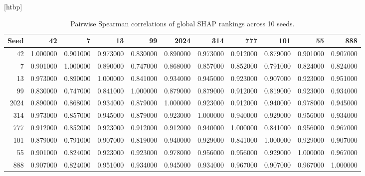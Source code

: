 \begin{table}
\small[htbp]
\caption{Pairwise Spearman correlations of global SHAP rankings across 10 seeds.}
\label{tab:A04_shap_stability_matrix}
\begin{tabular}{rrrrrrrrrrr}
\toprule
Seed & 42 & 7 & 13 & 99 & 2024 & 314 & 777 & 101 & 55 & 888 \\
\midrule
42 & 1.000000 & 0.901000 & 0.973000 & 0.830000 & 0.890000 & 0.973000 & 0.912000 & 0.879000 & 0.901000 & 0.907000 \\
7 & 0.901000 & 1.000000 & 0.890000 & 0.747000 & 0.868000 & 0.857000 & 0.852000 & 0.791000 & 0.824000 & 0.824000 \\
13 & 0.973000 & 0.890000 & 1.000000 & 0.841000 & 0.934000 & 0.945000 & 0.923000 & 0.907000 & 0.923000 & 0.951000 \\
99 & 0.830000 & 0.747000 & 0.841000 & 1.000000 & 0.879000 & 0.879000 & 0.912000 & 0.819000 & 0.923000 & 0.934000 \\
2024 & 0.890000 & 0.868000 & 0.934000 & 0.879000 & 1.000000 & 0.923000 & 0.912000 & 0.940000 & 0.978000 & 0.945000 \\
314 & 0.973000 & 0.857000 & 0.945000 & 0.879000 & 0.923000 & 1.000000 & 0.940000 & 0.929000 & 0.956000 & 0.934000 \\
777 & 0.912000 & 0.852000 & 0.923000 & 0.912000 & 0.912000 & 0.940000 & 1.000000 & 0.841000 & 0.956000 & 0.967000 \\
101 & 0.879000 & 0.791000 & 0.907000 & 0.819000 & 0.940000 & 0.929000 & 0.841000 & 1.000000 & 0.929000 & 0.907000 \\
55 & 0.901000 & 0.824000 & 0.923000 & 0.923000 & 0.978000 & 0.956000 & 0.956000 & 0.929000 & 1.000000 & 0.967000 \\
888 & 0.907000 & 0.824000 & 0.951000 & 0.934000 & 0.945000 & 0.934000 & 0.967000 & 0.907000 & 0.967000 & 1.000000 \\
\bottomrule
\end{tabular}
\end{table}
